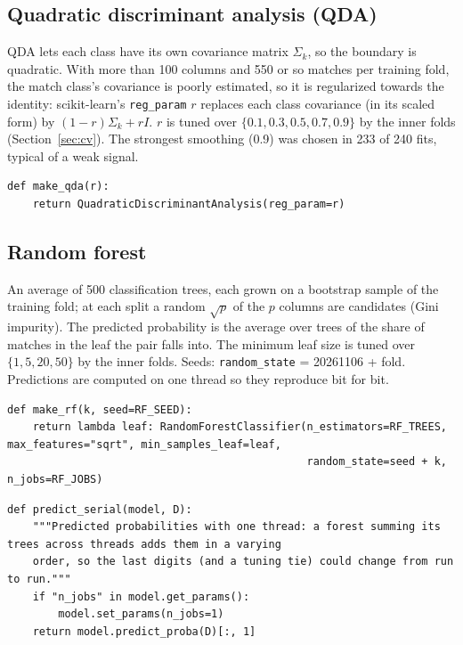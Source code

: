 \documentclass[11pt]{article}
\begin{document}
\subsection{Quadratic discriminant analysis (QDA)}

QDA lets each class have its own covariance matrix $\Sigma_k$, so the boundary is quadratic. With more than 100
columns and 550 or so matches per training fold, the match class's covariance is poorly estimated, so it is
regularized towards the identity: scikit-learn's \texttt{reg\_param} $r$ replaces each class covariance (in its scaled
form) by $(1-r)\Sigma_k + r I$. $r$ is tuned over $\{0.1, 0.3, 0.5, 0.7, 0.9\}$ by the
inner folds (Section~\ref{sec:cv}). The strongest smoothing (0.9) was chosen in 233 of 240 fits, typical of a weak
signal.

\begin{lstlisting}[caption={QDA (scripts/part1\_models.py)}]
def make_qda(r):
    return QuadraticDiscriminantAnalysis(reg_param=r)
\end{lstlisting}

\subsection{Random forest}

An average of 500 classification trees, each grown on a bootstrap sample of the training fold; at each split a random $\sqrt{p}$ of the $p$ columns are candidates (Gini impurity). The predicted probability is the average over trees of the share of matches in the leaf the pair falls into. The minimum leaf size is tuned over $\{1, 5, 20, 50\}$ by the inner folds. Seeds: \texttt{random\_state} = 20261106 + fold. Predictions are computed on one thread so they reproduce bit for bit.

\begin{lstlisting}[caption={Random forest (scripts/part1\_models.py)}]
def make_rf(k, seed=RF_SEED):
    return lambda leaf: RandomForestClassifier(n_estimators=RF_TREES, max_features="sqrt", min_samples_leaf=leaf,
                                               random_state=seed + k, n_jobs=RF_JOBS)
\end{lstlisting}

\begin{lstlisting}[caption={Predictions on one thread (scripts/part1\_models.py)}]
def predict_serial(model, D):
    """Predicted probabilities with one thread: a forest summing its trees across threads adds them in a varying
    order, so the last digits (and a tuning tie) could change from run to run."""
    if "n_jobs" in model.get_params():
        model.set_params(n_jobs=1)
    return model.predict_proba(D)[:, 1]
\end{lstlisting}
\end{document}
